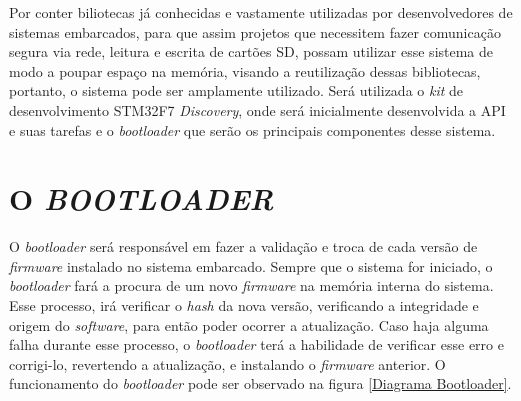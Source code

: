 Por conter biliotecas já conhecidas e vastamente utilizadas por desenvolvedores de sistemas embarcados, para que assim projetos que necessitem fazer comunicação segura via rede, leitura e escrita de cartões SD, possam utilizar esse sistema de modo a poupar espaço na memória, visando a reutilização dessas bibliotecas, portanto, o sistema pode ser amplamente utilizado. Será utilizada o \textit{kit} de desenvolvimento STM32F7 \textit{Discovery}, onde será inicialmente desenvolvida a API e suas tarefas e o \textit{bootloader} que serão os principais componentes desse sistema.





\section{O \textit{BOOTLOADER}}
\label{sec:Bootloader}

O \textit{bootloader} será responsável em fazer a validação e troca de cada versão de \textit{firmware} instalado no sistema embarcado. Sempre que o sistema for iniciado, o \textit{bootloader} fará a procura de um novo \textit{firmware} na memória interna do sistema. Esse processo, irá verificar o \textit{hash} da nova versão, verificando a integridade e origem do \textit{software}, para então poder ocorrer a atualização. Caso haja alguma falha durante esse processo, o \textit{bootloader} terá a habilidade de verificar esse erro e corrigi-lo, revertendo a atualização, e instalando o \textit{firmware} anterior. O funcionamento do \textit{bootloader} pode ser observado na figura \ref{Diagrama Bootloader}.

